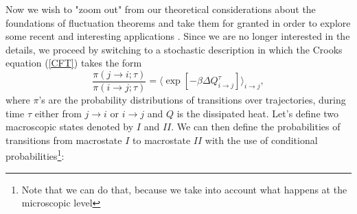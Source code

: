\documentclass[a4paper,12pt]{article}
\begin{document}
Now we wish to "zoom out" from our theoretical considerations about the foundations of fluctuation theorems and take them for granted in order to explore some recent and interesting applications \cite{Perunov:2016hl, England:2013ed}. 
Since we are no longer interested in the details, we proceed by switching to a stochastic description in which the Crooks equation (\ref{CFT}) takes the form
\begin{equation}
\label{MicroscopicIrreversibility}
\frac{\pi (j\to i;\tau )}{\pi (i\to j;\tau )}= \langle \exp[-\beta  \Delta Q_{i\to j}^{\tau}] \rangle_{i \to j},
\end{equation}
where $\pi$'s are the probability distributions of transitions over trajectories, during time $\tau$ either from $ j\to i$ or $ i \to j $ and $Q$ is the dissipated heat.
Let's define two macroscopic states denoted by $I$ and $II$.
We can then define the probabilities of transitions from macrostate $I$ to macrostate $II$ with the use of conditional probabilities\footnote{Note that we can do that, because we take into account what happens at the microscopic level}:
\end{document}
